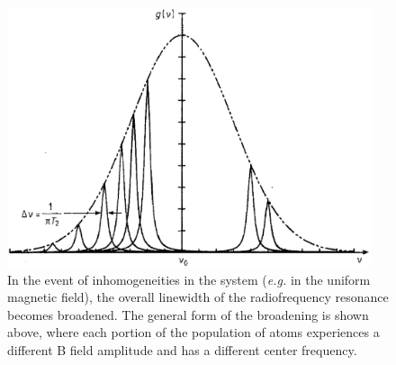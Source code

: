 \begin{figure}[h]
\begin{center}
\includegraphics[height=3in]{figures/inhomogeneous.eps}
\caption{\small{In the event of inhomogeneities in the system (\emph{e.g.} in the uniform magnetic field), the overall linewidth of the radiofrequency resonance becomes broadened. The general form of the broadening is shown above, where each portion of the population of atoms experiences a different B field amplitude and has a different center frequency.}}
\label{fig:inhomo}
\end{center}
\end{figure}


